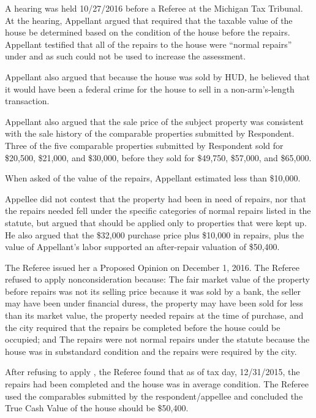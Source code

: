 A hearing was held 10/27/2016 before a Referee at the Michigan Tax Tribunal. At the hearing, Appellant argued that  required that the taxable value of the house be determined based on the condition of the house before the repairs. Appellant testified that all of the repairs to the house were ``normal repairs'' under  and as such could not be used to increase the assessment. 

Appellant also argued that because the house was sold by HUD, he believed that it would have been a federal crime for the house to sell in a non-arm's-length transaction.

Appellant also argued that the sale price of the subject property was consistent with the sale history of the comparable properties submitted by Respondent. Three of the five comparable properties submitted by Respondent sold for \$20,500, \$21,000, and \$30,000, before they sold for \$49,750, \$57,000, and \$65,000.

When asked of the value of the repairs, Appellant estimated less than \$10,000.

Appellee did not contest that the property had been in need of repairs, nor that the repairs needed fell under the specific categories of normal repairs listed in the statute, but argued that  should be applied only to properties that were kept up.
He also argued that the \$32,000 purchase price plus \$10,000 in repairs, plus the value of Appellant's labor supported an after-repair valuation of \$50,400.

The Referee issued her a Proposed Opinion on December 1, 2016. The Referee refused to apply  nonconsideration because:
The fair market value of the property before repairs was not its selling price because it  was sold by a bank, the seller may have been under financial duress, the property may have been sold for less than its market value, the property needed repairs at the time of purchase, and the city required that the repairs be completed before the house could be occupied; and
The repairs were not normal repairs under the statute because the house was in substandard condition and the repairs were required by the city. 

After refusing to apply , the Referee found that as of tax day, 12/31/2015, the repairs had been completed and the house was in average condition. The Referee used the comparables submitted by the respondent/appellee and concluded the True Cash Value of the house should be \$50,400. 


